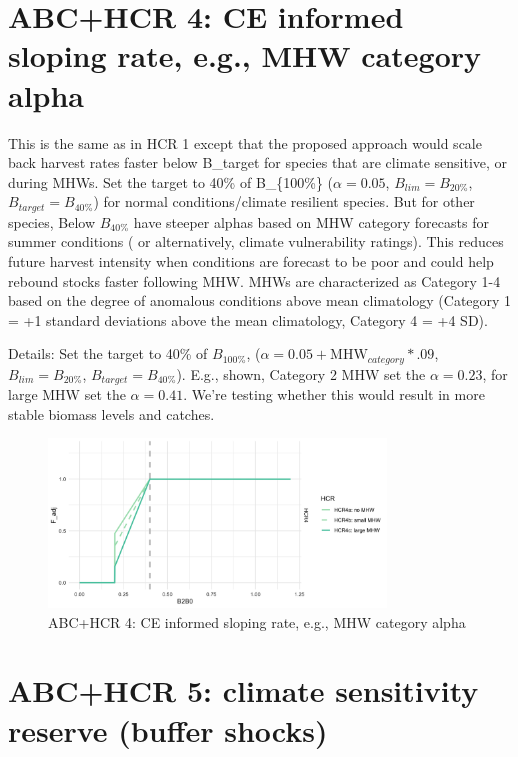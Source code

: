 \documentclass[
]{article}
\begin{document}
\section{ABC+HCR 4: CE informed sloping rate, e.g., MHW category
alpha}\label{abchcr-4-ce-informed-sloping-rate-e.g.-mhw-category-alpha}

This is the same as in HCR 1 except that the proposed approach would
scale back harvest rates faster below B\_target for species that are
climate sensitive, or during MHWs. Set the target to 40\% of
B\_\{100\%\} (\(\alpha = 0.05\), \(B_{lim} = B_{20\%}\),
\(B_{target} = B_{40\%}\)) for normal conditions/climate resilient
species. But for other species, Below \(B_{40\%}\) have steeper alphas
based on MHW category forecasts for summer conditions ( or
alternatively, climate vulnerability ratings). This reduces future
harvest intensity when conditions are forecast to be poor and could help
rebound stocks faster following MHW. MHWs are characterized as Category
1-4 based on the degree of anomalous conditions above mean climatology
(Category 1 = +1 standard deviations above the mean climatology,
Category 4 = +4 SD).

Details: Set the target to 40\% of \(B_{100\%}\),
(\(\alpha = 0.05+\mathrm{MHW}_{category}*.09\), \(B_{lim} = B_{20\%}\),
\(B_{target} = B_{40\%}\)). E.g., shown, Category 2 MHW set the
\(\alpha = 0.23\), for large MHW set the \(\alpha = 0.41\). We're
testing whether this would result in more stable biomass levels and
catches.

\begin{figure}
\centering
\includegraphics[width=0.8\textwidth,height=\textheight]{../../Figs/HCR_figs/HCR4.png}
\caption{ABC+HCR 4: CE informed sloping rate, e.g., MHW category alpha}
\end{figure}

\section{ABC+HCR 5: climate sensitivity reserve (buffer
shocks)}\label{abchcr-5-climate-sensitivity-reserve-buffer-shocks}
\end{document}
